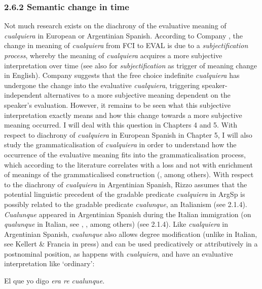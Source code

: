 \documentclass[output=paper]{langscibook}
\begin{document}
\subsubsection{\textbf{2.6.2} \textbf{Semantic} \textbf{change} \textbf{in} \textbf{time}}

Not much research exists on the diachrony of the evaluative meaning of \textit{cualquiera} in European or Argentinian Spanish. According to Company \citet{Company2009}, the change in meaning of \textit{cualquiera} from FCI to EVAL is due to a \textit{subjectification process}, whereby the meaning of \textit{cualquiera} acquires a more subjective interpretation over time (see also \citealt{Traugott1989} for \textit{subjectification} as trigger of meaning change in English). Company \citet{Company2009} suggests that the free choice indefinite \textit{cualquiera} has undergone the change into the evaluative \textit{cualquiera}, triggering speaker-independent alternatives to a more subjective meaning dependent on the speaker’s evaluation. However, it remains to be seen what this subjective interpretation exactly means and how this change towards a more subjective meaning occurred. I will deal with this question in Chapters 4 and 5. With respect to diachrony of \textit{cualquiera} in European Spanish in Chapter 5, I will also study the grammaticalisation of \textit{cualquiera} in order to understand how the occurrence of the evaluative meaning fits into the grammaticalisation process, which according to the literature correlates with a loss and not with enrichment of meanings of the grammaticalised construction (\citealt{Traugott1989}, among others). With respect to the diachrony of \textit{cualquiera} in Argentinian Spanish, Rizzo \citet{Salierno2013} assumes that the potential linguistic precedent of the gradable predicate \textit{cualquiera} in ArgSp is possibly related to the gradable predicate \textit{cualunque}, an Italianism (see 2.1.4). \textit{Cualunque} appeared in Argentinian Spanish during the Italian immigration (on \textit{qualunque} in Italian, see \citealt{Chierchia2006}, \citealt{AloniEtAl2010}, among others) (see 2.1.4). Like \textit{cualquiera} in Argentinian Spanish, \textit{cualunque} also allows degree modification (unlike in Italian, see Kellert \& Francia in press) and can be used predicatively or attributively in a postnominal position, as happens with \textit{cualquiera}, and have an evaluative interpretation like ‘ordinary’:

  El  que  yo  digo  \textit{era  re  cualunque.} 
\end{document}
